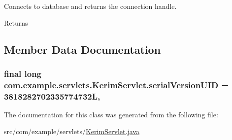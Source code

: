 Connects to database and returns the connection handle. 

\begin{DoxyReturn}{Returns}

\end{DoxyReturn}


\subsection{Member Data Documentation}
\hypertarget{classcom_1_1example_1_1servlets_1_1_kerim_servlet_a659a1f9d230ee60ab4f87c1f95d34ab9}{}
\subsubsection[{serial\+Version\+U\+I\+D}]{\setlength{\rightskip}{0pt plus 5cm}final long com.\+example.\+servlets.\+Kerim\+Servlet.\+serial\+Version\+U\+I\+D = 3818282702335774732\+L\hspace{0.3cm}{\ttfamily [static]}, {\ttfamily [private]}}\label{classcom_1_1example_1_1servlets_1_1_kerim_servlet_a659a1f9d230ee60ab4f87c1f95d34ab9}


The documentation for this class was generated from the following file\+:\begin{DoxyCompactItemize}
\item 
src/com/example/servlets/\hyperlink{_kerim_servlet_8java}{Kerim\+Servlet.\+java}\end{DoxyCompactItemize}
